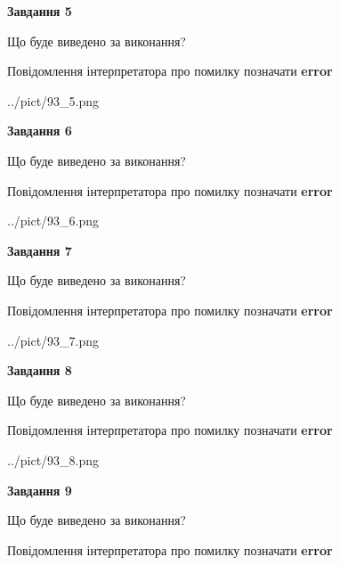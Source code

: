 \documentclass[11pt, ukrainian]{article}
\begin{document}
{\begin {large}
{\begin {center}\textbf{Завдання 5}\end {center}}\par
Що буде виведено за виконання? \par
Повідомлення інтерпретатора про помилку позначати \textbf{error}

\begin{center}
	{../pict/93_5.png}
\end{center}
\newpage

{\begin {center}\textbf{Завдання 6}\end {center}}\par
Що буде виведено за виконання? \par
Повідомлення інтерпретатора про помилку позначати \textbf{error}

\begin{center}
	{../pict/93_6.png}
\end{center}
\newpage

{\begin {center}\textbf{Завдання 7}\end {center}}\par
Що буде виведено за виконання? \par
Повідомлення інтерпретатора про помилку позначати \textbf{error}

\begin{center}
	{../pict/93_7.png}
\end{center}
\newpage

{\begin {center}\textbf{Завдання 8}\end {center}}\par
Що буде виведено за виконання? \par
Повідомлення інтерпретатора про помилку позначати \textbf{error}

\begin{center}
	{../pict/93_8.png}
\end{center}
\newpage

{\begin {center}\textbf{Завдання 9}\end {center}}\par
Що буде виведено за виконання? \par
Повідомлення інтерпретатора про помилку позначати \textbf{error}


\end{large}}
\end{document}
